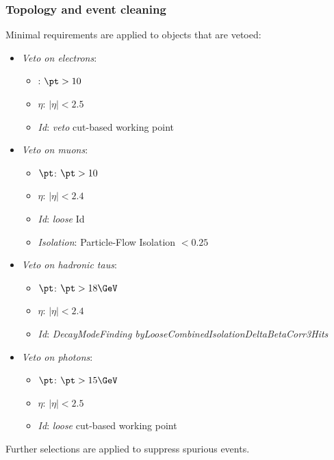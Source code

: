 \subsubsection{Topology and event cleaning}
Minimal requirements are applied to objects that are vetoed:
\begin{itemize}
     \item \textit{Veto on electrons}:
	\begin{itemize}
	\item \textit{\pt}: $\pt>10$ \GeV
	\item \textit{${\eta}$}: $|\eta|<2.5$
	\item \textit{Id}: \emph{veto} cut-based working point
	\end{itemize}
     \item \textit{Veto on muons}:
	\begin{itemize}
	\item \textit{${\pt}$}: $\pt>10$ \GeV
	\item \textit{${\eta}$}: $|\eta|<2.4$
	\item \textit{Id}: \emph{loose} Id
	\item \textit{Isolation}: Particle-Flow Isolation $<0.25$
	\end{itemize}
     \item \textit{Veto on hadronic taus}: 
	\begin{itemize}
	\item \textit{${\pt}$}: $\pt>18\GeV$
	\item \textit{${\eta}$}: $|\eta|<2.4$
	\item \textit{Id}: \emph{DecayModeFinding byLooseCombinedIsolationDeltaBetaCorr3Hits}
	\end{itemize}
     \item \textit{Veto on photons}:
	\begin{itemize}
	\item \textit{${\pt}$}: $\pt>15\GeV$
	\item \textit{${\eta}$}: $|\eta|<2.5$
	\item \textit{Id}: \emph{loose} cut-based working point
	\end{itemize}  
\end{itemize}
 
\noindent Further selections are applied to suppress spurious events.

